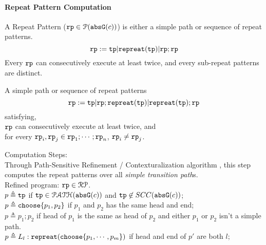 
\paragraph{Repeat Pattern Computation}
A Repeat Pattern ($\mathtt{rp} \in \mathcal{P}({\mathtt{abs}{\mathtt{G}}(c)})$) is either a simple path or sequence of repeat patterns. 
\[
  \mathtt{rp} := \mathtt{tp} | \mathtt{repreat}(\mathtt{tp}) | \mathtt{rp}; \mathtt{rp}
\]
Every $\mathtt{rp}$ can consecutively execute at least twice, and
 every sub-repeat patterns are distinct.
\begin{defn}
  A simple path or sequence of repeat patterns
  $$
  \mathtt{rp} := \mathtt{tp} | \mathtt{rp}; \mathtt{repreat}(\mathtt{tp}) | \mathtt{repreat}(\mathtt{tp}); \mathtt{rp}
  $$ 
  satisfying,
  \\
  $\mathtt{rp}$ can consecutively execute at least twice, and
  \\
  for every 
  $\mathtt{rp}_i, \mathtt{rp}_j \in \mathtt{rp}_1; \cdots; \mathtt{rp}_n$, $\mathtt{rp}_i \neq \mathtt{rp}_j$.
\end{defn}
%
Computation Steps:
\\
Through Path-Sensitive Refinement / Contexturalization algorithm \cite{GulwaniJK09, ZulegerGSV11},
this step computes the repeat patterns over all \emph{simple transition path}s.
\\
  Refined program:
  $\mathtt{rp} \in \mathcal{RP}$.
  \\
  $p \triangleq \mathtt{tp} $ if $\mathtt{tp} \in \mathcal{PATH}(\mathtt{abs}{\mathtt{G}}(c))$ and $\mathtt{tp} \not\in SCC(\mathtt{abs}{\mathtt{G}}(c))$;
  \\
  $p \triangleq \mathtt{choose}\{p_1, p_2 \}$ if $p_1$ and $p_2$ has the same head and end;
  \\
  $p \triangleq p_1; p_2$ if head of $p_1$ is the same as head of $p_2$ and either $p_1$ or $p_2$ isn't a simple path. 
  \\
  $p \triangleq L_l : \mathtt{repreat}(\mathtt{choose}\{p_1, \cdots, p_m\})$ if head and end of $p'$ are both $l$;
  
